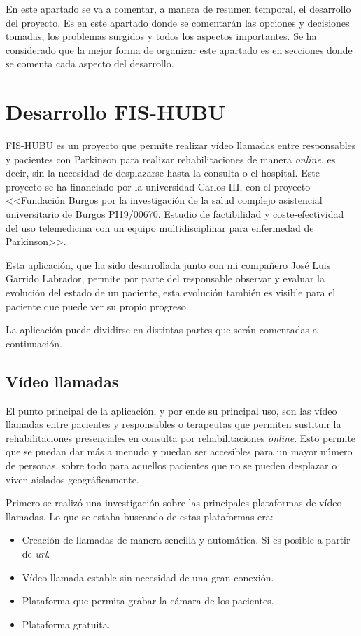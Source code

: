 
En este apartado se va a comentar, a manera de resumen temporal, el desarrollo del proyecto. Es en este apartado donde se comentarán las opciones y decisiones tomadas, los problemas surgidos y todos los aspectos importantes. Se ha considerado que la mejor forma de organizar este apartado es en secciones donde se comenta cada aspecto del desarrollo.

\section{Desarrollo FIS-HUBU}\label{desarrolloFH}
FIS-HUBU es un proyecto que permite realizar vídeo llamadas entre responsables y pacientes con Parkinson para realizar rehabilitaciones de manera \textit{online}, es decir, sin la necesidad de desplazarse hasta la consulta o el hospital. Este proyecto se ha financiado por la universidad Carlos III, con el proyecto  <<Fundación Burgos por la investigación de la salud complejo asistencial universitario de Burgos PI19/00670. Estudio de factibilidad y coste-efectividad del uso telemedicina con un equipo multidisciplinar para enfermedad de Parkinson>>.

Esta aplicación, que ha sido desarrollada junto con mi compañero José Luis Garrido Labrador, permite por parte del responsable observar y evaluar la evolución del estado de un paciente, esta evolución también es visible para el paciente que puede ver su propio progreso.

La aplicación puede dividirse en distintas partes que serán comentadas a continuación.
\subsection{Vídeo llamadas}
El punto principal de la aplicación, y por ende su principal uso, son las vídeo llamadas entre pacientes y responsables o terapeutas que permiten sustituir la rehabilitaciones presenciales en consulta por rehabilitaciones \textit{online}. Esto permite que se puedan dar más a menudo y puedan ser accesibles para un mayor número de personas, sobre todo para aquellos pacientes que no se pueden desplazar o viven aislados geográficamente.

Primero se realizó una investigación sobre las principales plataformas de vídeo llamadas. Lo que se estaba buscando de estas plataformas era:
\begin{itemize}
	\item Creación de llamadas de manera sencilla y automática. Si es posible a partir de \textit{url}.
	\item Vídeo llamada estable sin necesidad de una gran conexión.
	\item Plataforma que permita grabar la cámara de los pacientes.
	\item Plataforma gratuita.
\end{itemize}

